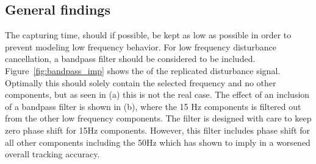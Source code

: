 \subsection{General findings}\label{subsec:longterm}
The capturing time, should if possible, be kept as low as possible in order to prevent modeling low frequency behavior. For low frequency disturbance cancellation, a bandpass filter should be considered to be included. Figure~\ref{fig:bandpass_imp} shows the \abbrFFT of the replicated disturbance signal. Optimally this should solely contain the selected frequency and no other components, but as seen in (a) this is not the real case. The effect of an inclusion of a bandpass filter is shown in (b), where the 15 Hz components is filtered out from the other low frequency components. The filter is designed with care to keep zero phase shift for 15Hz components. However, this filter includes phase shift for all other components including the 50Hz which has shown to imply in a worsened overall tracking accuracy.

